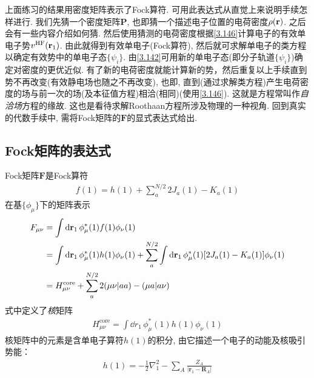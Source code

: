 上面练习的结果用密度矩阵表示了Fock算符. 
可用此表达式从直觉上来说明\hft 手续怎样进行. 
我们先猜一个密度矩阵$\mathbf{P}$, 
也即猜一个描述电子位置的电荷密度$\rho(\mathbf{r})$. 
之后会有一些内容介绍如何猜. 
然后使用猜测的电荷密度根据\autoref{3.146}计算电子的有效单电子势$v^\mathrm{HF}(\mathbf{r}_1)$. 
由此就得到有效单电子\ha (Fock算符), 
然后就可求解单电子的类\sch 方程以确定有效势中的单电子态$\{\psi_i\}$. 
由\autoref{3.142}可用新的单电子态(即分子轨道$\{\psi_i\}$)确定对密度的更优近似. 
有了新的电荷密度就能计算新的\hft 势，然后重复以上手续直到\hft 势不再改变(有效静电场也随之不再改变), 
也即, 
直到(通过求解类\sch 方程)产生电荷密度的场与前一次的场(及\hft 本征值方程)相洽(相同)(使用\autoref{3.146}). 
这就是\hft 方程常叫作\emph{自洽场}方程的缘故. 
这也是看待求解Roothaan方程所涉及物理的一种视角. 
回到真实的代数手续中, 
需将Fock矩阵的$\mathbf{F}$的显式表达式给出.

\subsection{Fock矩阵的表达式}
Fock矩阵$\mathbf{F}$是Fock算符
\begin{align}
	f(1) = h(1) + \sum_{a}^{N/2}2J_a(1) -K_a(1)
\end{align}
在基$\{\phi_\mu\}$下的矩阵表示
\begin{align}
	\label{3.148}
	F_{\mu\nu} & = \int\dd{r}_1\,\phi_\mu^*(1)f(1)\phi_\nu(1)\notag\\
	& = \int\dd{r}_1\,\phi_\mu^*(1)h(1)\phi_\nu(1) + \sum_{a}^{N/2}\int\dd{r}_1\,\phi_\mu^*(1)[2J_a(1)-K_a(1)]\phi_\nu(1)\notag\\
	& = H_{\mu\nu}^\mathrm{core} + \sum_{a}^{N/2}2(\mu\nu|aa)-(\mu a|a\nu)
\end{align}
式中定义了\emph{核\ha}矩阵
\begin{align}
	H_{\mu\nu}^\mathrm{core} = \int\dd{r}_1\,\phi_\mu^*(1)h(1)\phi_\nu(1)
\end{align}
核\ha 矩阵中的元素是含单电子算符$h(1)$的积分, 
由它描述一个电子的动能及核吸引势能：
\begin{align}
	h(1) = -\frac{1}{2}\nabla_1^2 - \sum_A\frac{Z_A}{|\mathbf{r}_1-\mathbf{R}_A|}
\end{align}

